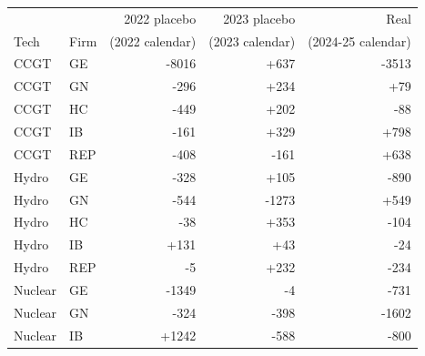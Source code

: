 \begin{tabular}{l l r r r}
\toprule
 & & 2022 placebo & 2023 placebo & Real \\
Tech & Firm & (2022 calendar) & (2023 calendar) & (2024-25 calendar) \\
\midrule
CCGT & GE & -8016 & +637 & -3513 \\
CCGT & GN & -296 & +234 & +79 \\
CCGT & HC & -449 & +202 & -88 \\
CCGT & IB & -161 & +329 & +798 \\
CCGT & REP & -408 & -161 & +638 \\
Hydro & GE & -328 & +105 & -890 \\
Hydro & GN & -544 & -1273 & +549 \\
Hydro & HC & -38 & +353 & -104 \\
Hydro & IB & +131 & +43 & -24 \\
Hydro & REP & -5 & +232 & -234 \\
Nuclear & GE & -1349 & -4 & -731 \\
Nuclear & GN & -324 & -398 & -1602 \\
Nuclear & IB & +1242 & -588 & -800 \\
\bottomrule
\end{tabular}